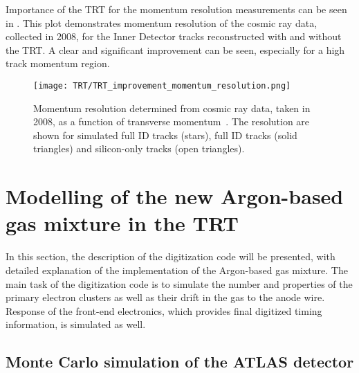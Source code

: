 Importance of the TRT for the momentum resolution measurements can be seen in .
This plot demonstrates momentum resolution of the cosmic ray data, collected in 2008, for the Inner Detector tracks reconstructed with and without the TRT.
A clear and significant improvement can be seen, especially for a high track momentum region.


\begin{figure}
\centering
\texttt{[image: TRT/TRT\_improvement\_momentum\_resolution.png]}
\caption{ 
Momentum resolution determined from cosmic ray data, taken in 2008, as a function of transverse momentum~\cite{Aad:2010bx}.
The resolution are shown for simulated full ID tracks (stars), full ID tracks (solid triangles) and silicon-only tracks (open triangles).
}
\label{fig:improvement_of_momentum_resolution}
\end{figure}



\section{Modelling of the new Argon-based gas mixture in the TRT}
\label{sec:digi_argon}

In this section, the description of the digitization code will be presented, with detailed explanation of the implementation of the Argon-based gas mixture.
The main task of the digitization code is to simulate the number and properties of the primary electron clusters as well as their drift in the gas to the anode wire.
Response of the front-end electronics, which provides final digitized timing information, is simulated as well.

\subsection{Monte Carlo simulation of the ATLAS detector}

